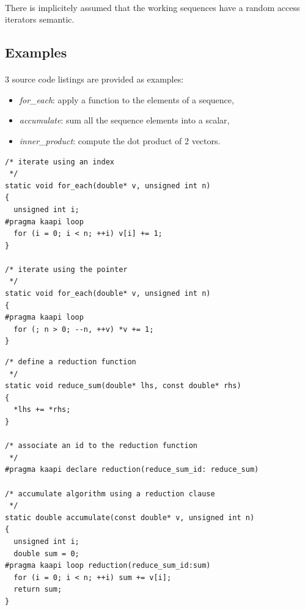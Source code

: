 \documentclass[a4paper, 11pt]{article}
\begin{document}
\paragraph{}
There is implicitely assumed that the working sequences have a random access iterators
semantic.

\subsection{Examples}
\paragraph{}
3 source code listings are provided as examples:
\begin{itemize}
\item \textit{for\_each}: apply a function to the elements of a sequence,
\item \textit{accumulate}: sum all the sequence elements into a scalar,
\item \textit{inner\_product}: compute the dot product of 2 vectors.
\end{itemize}

\pagebreak
\begin{small}
\lstset{language=C}
\begin{lstlisting}[frame=tb, caption={for\_each}]
/* iterate using an index
 */
static void for_each(double* v, unsigned int n)
{
  unsigned int i;
#pragma kaapi loop
  for (i = 0; i < n; ++i) v[i] += 1;
}

/* iterate using the pointer
 */
static void for_each(double* v, unsigned int n)
{
#pragma kaapi loop
  for (; n > 0; --n, ++v) *v += 1;
}

\end{lstlisting}
\end{small}

\begin{small}
\lstset{language=C}
\begin{lstlisting}[frame=tb, caption={accumulate}]
/* define a reduction function
 */
static void reduce_sum(double* lhs, const double* rhs)
{
  *lhs += *rhs;
}

/* associate an id to the reduction function
 */
#pragma kaapi declare reduction(reduce_sum_id: reduce_sum)

/* accumulate algorithm using a reduction clause
 */
static double accumulate(const double* v, unsigned int n)
{
  unsigned int i;
  double sum = 0;
#pragma kaapi loop reduction(reduce_sum_id:sum)
  for (i = 0; i < n; ++i) sum += v[i];
  return sum;
}
\end{lstlisting}
\end{small}
\end{document}
